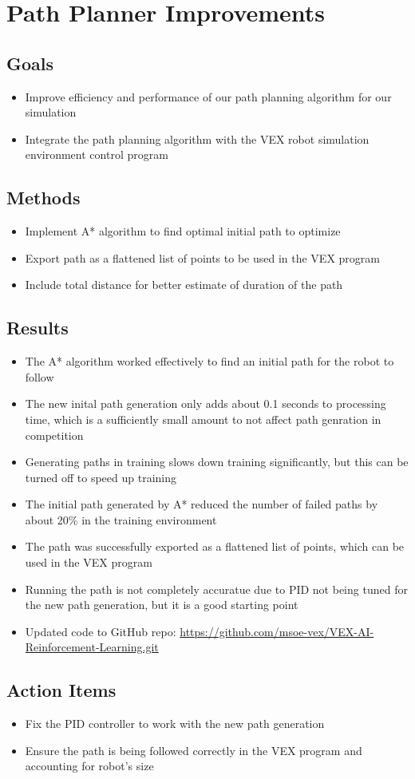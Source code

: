 \section{Path Planner Improvements}

\subsection{Goals}
\begin{itemize}
    \item Improve efficiency and performance of our path planning algorithm for our simulation
    \item Integrate the path planning algorithm with the VEX robot simulation environment control program
\end{itemize}

\subsection{Methods}
\begin{itemize}
    \item Implement A* algorithm to find optimal initial path to optimize
    \item Export path as a flattened list of points to be used in the VEX program
    \item Include total distance for better estimate of duration of the path
\end{itemize}

\subsection{Results}
\begin{itemize}
    \item The A* algorithm worked effectively to find an initial path for the robot to follow
    \item The new inital path generation only adds about 0.1 seconds to processing time, which is a sufficiently small amount to not affect path genration in competition
    \item Generating paths in training slows down training significantly, but this can be turned off to speed up training
    \item The initial path generated by A* reduced the number of failed paths by about 20\% in the training environment
    \item The path was successfully exported as a flattened list of points, which can be used in the VEX program
    \item Running the path is not completely accuratue due to PID not being tuned for the new path generation, but it is a good starting point
    \item Updated code to GitHub repo: \href{https://github.com/msoe-vex/VEX-AI-Reinforcement-Learning.git}{https://github.com/msoe-vex/VEX-AI-Reinforcement-Learning.git}
\end{itemize}

\subsection{Action Items}
\begin{itemize}
    \item Fix the PID controller to work with the new path generation
    \item Ensure the path is being followed correctly in the VEX program and accounting for robot's size
\end{itemize}